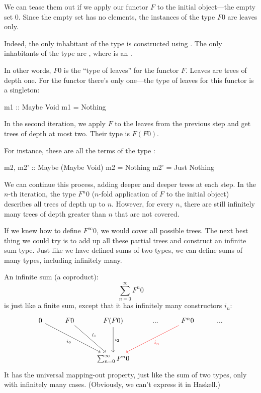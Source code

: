 \documentclass[DaoFP]{subfiles}
\begin{document}
We can tease them out if we apply our functor $F$ to the initial object---the empty set $0$. Since the empty set has no elements, the instances of the type $F 0$ are leaves only. 

Indeed, the only inhabitant of the type  is constructed using . The only inhabitants of the type  are , where  is an .

In other words, $F 0$ is the ``type of leaves'' for the functor $F$. Leaves are trees of depth one. For the  functor there's only one---the type of leaves for this functor is a singleton:
\begin{haskell}
m1 :: Maybe Void
m1 = Nothing
\end{haskell}

In the second iteration, we apply $F$ to the leaves from the previous step and get trees of depth at most two. Their type is $F(F 0)$. 

For instance, these are all the terms of the type :
\begin{haskell}
m2, m2' :: Maybe (Maybe Void)
m2 = Nothing
m2' = Just Nothing
\end{haskell}

We can continue this process, adding deeper and deeper trees at each step. In the $n$-th iteration, the type $F^n 0$ ($n$-fold application of $F$ to the initial object) describes all trees of depth up to $n$. However, for every $n$, there are still infinitely many trees of depth greater than $n$ that are not covered. 

If we knew how to define $F^{\infty} 0$, we would cover all possible trees. The next best thing we could try is to add up all these partial trees and construct an infinite sum type. Just like we have defined sums of two types, we can define sums of many types, including infinitely many. 

An infinite sum (a coproduct):
$$ \sum_{n = 0}^{\infty} F^n 0$$
is just like a finite sum, except that it has infinitely many constructors $i_n$:
\[
 \begin{tikzcd}
 0
 \arrow[ddrr, "i_0"']
 & F 0
  \arrow[ddr, "i_1"]
& F (F 0)
  \arrow[dd, "i_2"]
 & ...
 & F^n 0
  \arrow[ddll, red, "i_n"]
 & ...
 \\
 \\
 &&\sum_{n = 0}^{\infty} F^n 0
  \end{tikzcd}
\]
It has the universal mapping-out property, just like the sum of two types, only with infinitely many cases. (Obviously, we can't express it in Haskell.)
\end{document}
